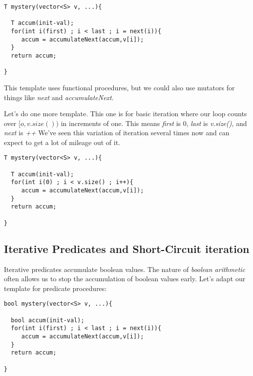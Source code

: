 \documentclass[]{tufte-handout}
\begin{document}
\begin{verbatim}
T mystery(vector<S> v, ...){
  
  T accum(init-val);
  for(int i(first) ; i < last ; i = next(i)){
     accum = accumulateNext(accum,v[i]);  
  } 
  return accum;

} 
\end{verbatim}
This template uses functional procedures, but we could also use mutators for things like \textit{next} and \textit{accumulateNext}.

Let's do one more template. This one is for basic iteration where our loop counts over $[o,v.size() )$ in increments of one.  This means \textit{first} is 0, \textit{last} is \textit{v.size()}, and \textit{next} is \textit{++}  We've seen this variation of iteration several times now and can expect to get a lot of mileage out of it.
\begin{verbatim}
T mystery(vector<S> v, ...){
  
  T accum(init-val);
  for(int i(0) ; i < v.size() ; i++){
     accum = accumulateNext(accum,v[i]);  
  } 
  return accum;

} 
\end{verbatim}

\subsection{Iterative Predicates and Short-Circuit iteration}

Iterative predicates accumulate boolean values. The nature of \textit{boolean arithmetic} often allows us to stop the accumulation of boolean values early.   Let's adapt our template for predicate procedures:
\begin{verbatim}
bool mystery(vector<S> v, ...){
  
  bool accum(init-val);
  for(int i(first) ; i < last ; i = next(i)){
     accum = accumulateNext(accum,v[i]);  
  } 
  return accum;

} 
\end{verbatim}
\end{document}
